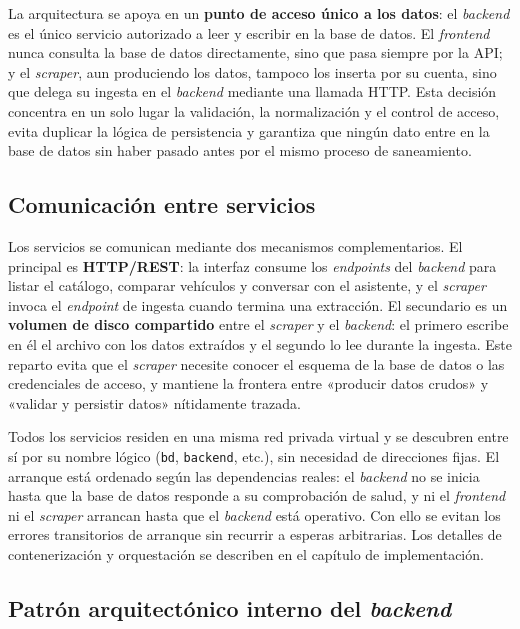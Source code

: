 La arquitectura se apoya en un \textbf{punto de acceso único a los datos}: el
\emph{backend} es el único servicio autorizado a leer y escribir en la base de
datos. El \emph{frontend} nunca consulta la base de datos directamente, sino que
pasa siempre por la API; y el \emph{scraper}, aun produciendo los datos, tampoco
los inserta por su cuenta, sino que delega su ingesta en el \emph{backend}
mediante una llamada HTTP. Esta decisión concentra en un solo lugar la
validación, la normalización y el control de acceso, evita duplicar la lógica de
persistencia y garantiza que ningún dato entre en la base de datos sin haber
pasado antes por el mismo proceso de saneamiento.

\subsection*{Comunicación entre servicios}

Los servicios se comunican mediante dos mecanismos complementarios. El principal
es \textbf{HTTP/REST}: la interfaz consume los \emph{endpoints} del \emph{backend}
para listar el catálogo, comparar vehículos y conversar con el asistente, y el
\emph{scraper} invoca el \emph{endpoint} de ingesta cuando termina una
extracción. El secundario es un \textbf{volumen de disco compartido} entre el
\emph{scraper} y el \emph{backend}: el primero escribe en él el archivo con los
datos extraídos y el segundo lo lee durante la ingesta. Este reparto evita que
el \emph{scraper} necesite conocer el esquema de la base de datos o las
credenciales de acceso, y mantiene la frontera entre «producir datos crudos» y
«validar y persistir datos» nítidamente trazada.

Todos los servicios residen en una misma red privada virtual y se descubren
entre sí por su nombre lógico (\texttt{bd}, \texttt{backend}, etc.), sin
necesidad de direcciones fijas. El arranque está ordenado según las dependencias
reales: el \emph{backend} no se inicia hasta que la base de datos responde a su
comprobación de salud, y ni el \emph{frontend} ni el \emph{scraper} arrancan
hasta que el \emph{backend} está operativo. Con ello se evitan los errores
transitorios de arranque sin recurrir a esperas arbitrarias. Los detalles de
contenerización y orquestación se describen en el capítulo de implementación.

\subsection*{Patrón arquitectónico interno del \emph{backend}}

